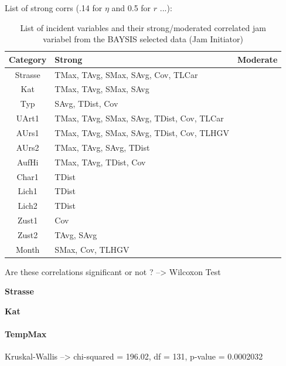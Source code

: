 \documentclass[a4paper,headsepline,footsepline,fontsize=11pt,BCOR=12mm,DIV=12]{report}
\begin{document}
List of strong corrs (.14 for $\eta$ and 0.5 for $r$ ...):

\noindent
\begin{table}[h]
	\centering
	\begin{tabular}{c|l|l}  
		\toprule
		\textbf{Category} & \textbf{Strong} & \textbf{Moderate} \\
		\midrule
		Strasse & TMax, TAvg, SMax, SAvg, Cov, TLCar & \\ 
 		Kat & TMax, TAvg, SMax, SAvg & \\ 
 		Typ & SAvg, TDist, Cov & \\
 		UArt1 & TMax, TAvg, SMax, SAvg, TDist, Cov, TLCar & \\
 		AUrs1 & TMax, TAvg, SMax, SAvg, TDist, Cov, TLHGV & \\
 		AUrs2 & TMax, TAvg, SAvg, TDist & \\
 		AufHi & TMax, TAvg, TDist, Cov & \\
 		Char1 & TDist & \\
 		Lich1 & TDist & \\
 		Lich2 & TDist & \\
 		Zust1 & Cov & \\
 		Zust2 & TAvg, SAvg & \\
 		Month & SMax, Cov, TLHGV & \\
 		\bottomrule
	\end{tabular}
	\caption{List of incident variables and their strong/moderated correlated jam variabel from the BAYSIS selected data (Jam Initiator)}
\end{table}

Are these correlations significant or not ? --> Wilcoxon Test

\large
\centerline{\textbf{Strasse}}
\normalsize

\centerline{\textbf{Kat}}

\paragraph{TempMax}

Kruskal-Wallis --> chi-squared = 196.02, df = 131, p-value = 0.0002032
\end{document}
